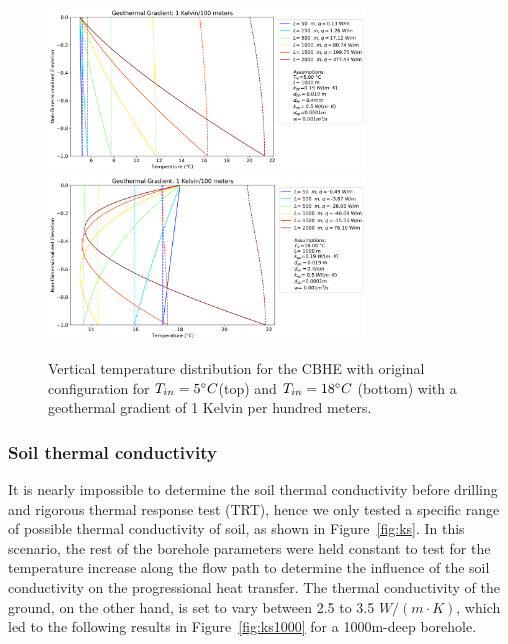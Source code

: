 	    \begin{figure}[h!]
	        \centering
	        \includegraphics[width=0.75\textwidth]{depths_5_1k_Tin5_w3.png}
	        \includegraphics[width=0.75\textwidth]{depths_5_1k_Tin18_w3.png}
	        \caption{Vertical temperature distribution for the CBHE with original configuration for $T_{in} = 5\degree C$(top) and $T_{in} = 18\degree C$ (bottom) with a geothermal gradient of 1 Kelvin per hundred meters.}
	        \label{fig:1K}
	    \end{figure}
	   
	        \subsubsection{Soil thermal conductivity}
	        It is nearly impossible to determine the soil thermal conductivity before drilling and rigorous thermal response test (TRT), hence we only tested a specific range of possible thermal conductivity of soil, as shown in Figure~\ref{fig:ks}. In this scenario, the rest of the borehole parameters were held constant to test for the temperature increase along the flow path to determine the influence of the soil conductivity on the progressional heat transfer. The thermal conductivity of the ground, on the other hand, is set to vary between 2.5 to 3.5 $W/(m \cdot K)$, which led to the following results in Figure~\ref{fig:ks1000} for a 1000m-deep borehole.

